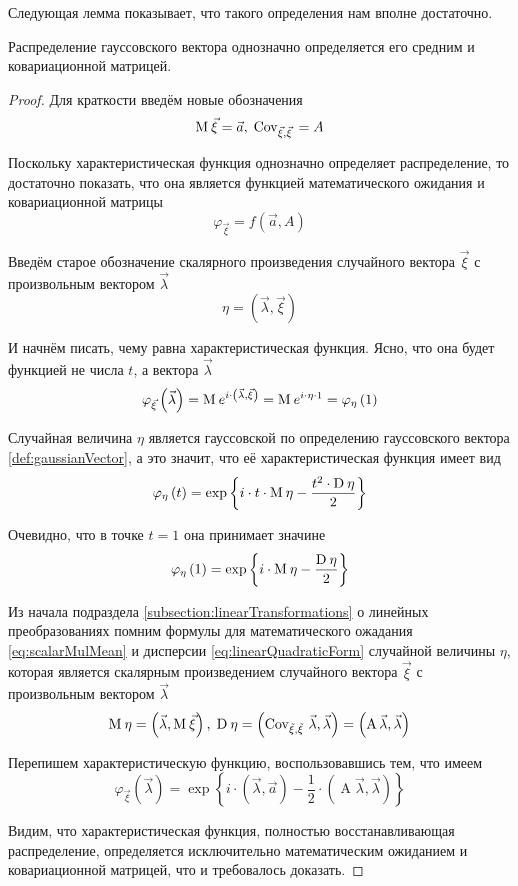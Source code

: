 Следующая лемма показывает, что такого определения нам вполне достаточно.

\begin{lemma}
    Распределение гауссовского вектора однозначно определяется его средним и
    ковариационной матрицей.
\end{lemma}
\begin{proof}
    Для краткости введём новые обозначения
    $$\operatorname{M}_{} \vec{\xi} = \vec{a},\; \operatorname{Cov}_{\vec{\xi}, \vec{\xi}}\, = A$$

    Поскольку характеристическая функция однозначно определяет распределение,
    то достаточно показать, что она является функцией математического ожидания
    и ковариационной матрицы
    $$\varphi_{\vec{\xi}} = f\left( \vec{a}, A \right)$$

    Введём старое обозначение скалярного произведения случайного вектора
    $\vec{\xi}$ с произвольным вектором $\vec{\lambda}$
    $$\eta = \left( \vec{\lambda}, \vec{\xi} \right)$$

    И начнём писать, чему равна характеристическая функция. Ясно, что она будет
    функцией не числа $t$, а вектора $\vec{\lambda}$
    $$\varphi_{\vec{\xi}}\left( \vec{\lambda} \right)
        = \operatorname{M}_{} e^{i \cdot \left( \vec{\lambda}, \vec{\xi} \right)}
        = \operatorname{M}_{} e^{i \cdot \eta \cdot 1}
        = \varphi_{\eta}\left( 1 \right)$$

    Случайная величина $\eta$ является гауссовской по определению гауссовского
    вектора \ref{def:gaussianVector}, а это значит, что её характеристическая
    функция имеет вид
    $$\varphi_{\eta}\left( t \right)
        = \exp{\left\{ i \cdot t \cdot \operatorname{M}_{} \eta
            - \frac{t^2 \cdot \operatorname{D}_{} \eta}{2} \right\}}$$

    Очевидно, что в точке $t=1$ она принимает значине
    $$\varphi_{\eta}\left( 1 \right)
        = \exp{\left\{ i \cdot \operatorname{M}_{} \eta
            - \frac{\operatorname{D}_{} \eta}{2} \right\}}$$

    Из начала подраздела \ref{subsection:linearTransformations} о линейных
    преобразованиях помним формулы для математического ожадания
    \eqref{eq:scalarMulMean} и дисперсии \eqref{eq:linearQuadraticForm}
    случайной величины $\eta$, которая является скалярным произведением
    случайного вектора $\vec{\xi}$ с произвольным вектором $\vec{\lambda}$
    $$\operatorname{M}_{} \eta = \left( \vec{\lambda}, \operatorname{M}_{} \vec{\xi} \right),\;
        \operatorname{D}_{} \eta
            = \left( \operatorname{\operatorname{Cov}_{\vec{\xi}, \vec{\xi}}\,} \vec{\lambda} ,
                \vec{\lambda} \right)
            = \left( \operatorname{A} \vec{\lambda} ,
                \vec{\lambda} \right)$$

    Перепишем характеристическую функцию, воспользовавшись тем, что имеем
    $$\varphi_{\vec{\xi}}\left( \vec{\lambda} \right)
        = \exp{\left\{ i \cdot \left( \vec{\lambda}, \vec{a} \right)
            - \frac{1}{2} \cdot \left( \operatorname{A} \vec{\lambda} ,
                \vec{\lambda} \right) \right\}}$$

    Видим, что характеристическая функция, полностью восстанавливающая
    распределение, определяется исключительно математическим ожиданием
    и ковариационной матрицей, что и требовалось доказать.
\end{proof}


